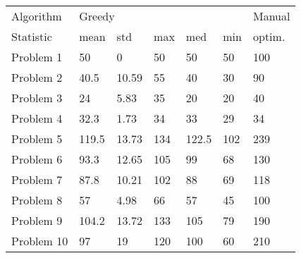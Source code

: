 \begin{tabular}{lllllll}
\toprule
Algorithm & \multicolumn{5}{l}{Greedy} & Manual \\
Statistic &   mean &    std &  max &    med &  min & optim. \\
\midrule
Problem 1  &     50 &      0 &   50 &     50 &   50 &    100 \\
Problem 2  &   40.5 &  10.59 &   55 &     40 &   30 &     90 \\
Problem 3  &     24 &   5.83 &   35 &     20 &   20 &     40 \\
Problem 4  &   32.3 &   1.73 &   34 &     33 &   29 &     34 \\
Problem 5  &  119.5 &  13.73 &  134 &  122.5 &  102 &    239 \\
Problem 6  &   93.3 &  12.65 &  105 &     99 &   68 &    130 \\
Problem 7  &   87.8 &  10.21 &  102 &     88 &   69 &    118 \\
Problem 8  &     57 &   4.98 &   66 &     57 &   45 &    100 \\
Problem 9  &  104.2 &  13.72 &  133 &    105 &   79 &    190 \\
Problem 10 &     97 &     19 &  120 &    100 &   60 &    210 \\
\bottomrule
\end{tabular}
